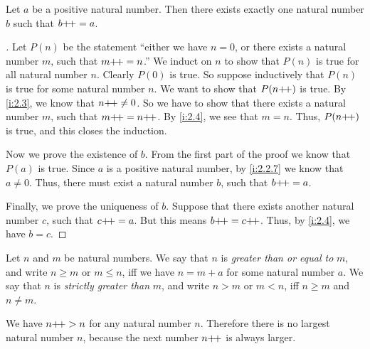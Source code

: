 \begin{lem}\label{i:2.2.10}
  Let \(a\) be a positive natural number.
  Then there exists exactly one natural number \(b\) such that \(b{+}\!{+} = a\).
\end{lem}

\begin{proof}[]
  Let \(P(n)\) be the statement ``either we have \(n = 0\), or there exists a natural number \(m\), such that \(m{+}\!{+} = n\).''
  We induct on \(n\) to show that \(P(n)\) is true for all natural number \(n\).
  Clearly \(P(0)\) is true.
  So suppose inductively that \(P(n)\) is true for some natural number \(n\).
  We want to show that \(P(n{+}\!{+})\) is true.
  By \cref{i:2.3}, we know that \(n{+}\!{+} \neq 0\).
  So we have to show that there exists a natural number \(m\), such that \(m{+}\!{+} = n{+}\!{+}\).
  By \cref{i:2.4}, we see that \(m = n\).
  Thus, \(P(n{+}\!{+})\) is true, and this closes the induction.

  Now we prove the existence of \(b\).
  From the first part of the proof we know that \(P(a)\) is true.
  Since \(a\) is a positive natural number, by \cref{i:2.2.7} we know that \(a \neq 0\).
  Thus, there must exist a natural number \(b\), such that \(b{+}\!{+} = a\).

  Finally, we prove the uniqueness of \(b\).
  Suppose that there exists another natural number \(c\), such that \(c{+}\!{+} = a\).
  But this means \(b{+}\!{+} = c{+}\!{+}\).
  Thus, by \cref{i:2.4}, we have \(b = c\).
\end{proof}

\begin{defn}\label{i:2.2.11}
  Let \(n\) and \(m\) be natural numbers.
  We say that \(n\) is \emph{greater than or equal to} \(m\), and write \(n \geq m\) or \(m \leq n\), iff we have \(n = m + a\) for some natural number \(a\).
  We say that \(n\) is \emph{strictly greater than} \(m\), and write \(n > m\) or \(m < n\), iff \(n \geq m\) and \(n \neq m\).
\end{defn}

\begin{ac}\label{i:ac:2.2.3}
  We have \(n{+}\!{+} > n\) for any natural number \(n\).
  Therefore there is no largest natural number \(n\), because the next number \(n{+}\!{+}\) is always larger.
\end{ac}

